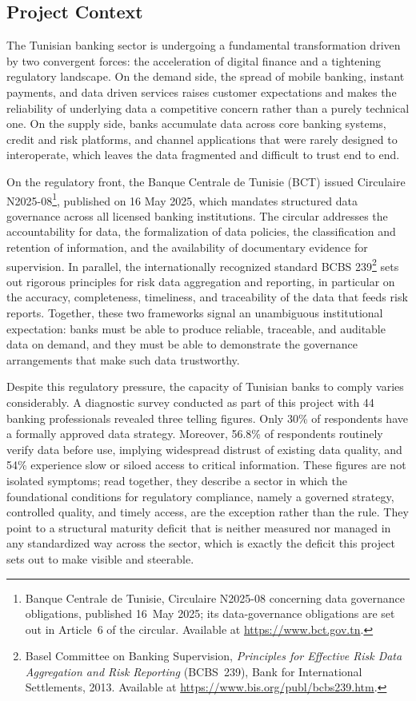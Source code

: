 \subsection{Project Context}

The Tunisian banking sector is undergoing a fundamental transformation driven by two convergent forces: the acceleration of digital finance and a tightening regulatory landscape. On the demand side, the spread of mobile banking, instant payments, and data driven services raises customer expectations and makes the reliability of underlying data a competitive concern rather than a purely technical one. On the supply side, banks accumulate data across core banking systems, credit and risk platforms, and channel applications that were rarely designed to interoperate, which leaves the data fragmented and difficult to trust end to end.

On the regulatory front, the Banque Centrale de Tunisie (BCT) issued Circulaire N\textdegree{}2025-08\footnote{Banque Centrale de Tunisie, Circulaire N\textdegree{}2025-08 concerning data governance obligations, published 16~May 2025; its data-governance obligations are set out in Article~6 of the circular. Available at \url{https://www.bct.gov.tn}.}, published on 16 May 2025, which mandates structured data governance across all licensed banking institutions. The circular addresses the accountability for data, the formalization of data policies, the classification and retention of information, and the availability of documentary evidence for supervision. In parallel, the internationally recognized standard BCBS 239\footnote{Basel Committee on Banking Supervision, \emph{Principles for Effective Risk Data Aggregation and Risk Reporting} (BCBS~239), Bank for International Settlements, 2013. Available at \url{https://www.bis.org/publ/bcbs239.htm}.} sets out rigorous principles for risk data aggregation and reporting, in particular on the accuracy, completeness, timeliness, and traceability of the data that feeds risk reports. Together, these two frameworks signal an unambiguous institutional expectation: banks must be able to produce reliable, traceable, and auditable data on demand, and they must be able to demonstrate the governance arrangements that make such data trustworthy.

Despite this regulatory pressure, the capacity of Tunisian banks to comply varies considerably. A diagnostic survey conducted as part of this project with 44 banking professionals revealed three telling figures. Only 30\% of respondents have a formally approved data strategy. Moreover, 56.8\% of respondents routinely verify data before use, implying widespread distrust of existing data quality, and 54\% experience slow or siloed access to critical information. These figures are not isolated symptoms; read together, they describe a sector in which the foundational conditions for regulatory compliance, namely a governed strategy, controlled quality, and timely access, are the exception rather than the rule. They point to a structural maturity deficit that is neither measured nor managed in any standardized way across the sector, which is exactly the deficit this project sets out to make visible and steerable.

